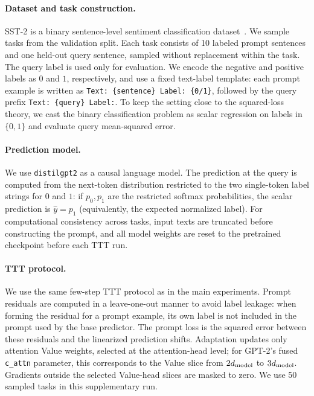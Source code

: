 \documentclass{article}
\theoremstyle{plain}
\theoremstyle{definition}
\theoremstyle{remark}
\begin{document}
\paragraph{Dataset and task construction.}
SST-2 is a binary sentence-level sentiment classification dataset~\citep{socher-etal-2013-recursive}. We sample tasks from the validation split. Each task consists of 10 labeled prompt sentences and one held-out query sentence, sampled without replacement within the task. The query label is used only for evaluation. We encode the negative and positive labels as $0$ and $1$, respectively, and use a fixed text-label template: each prompt example is written as \texttt{Text: \{sentence\} Label: \{0/1\}}, followed by the query prefix \texttt{Text: \{query\} Label:}. To keep the setting close to the squared-loss theory, we cast the binary classification problem as scalar regression on labels in $\{0,1\}$ and evaluate query mean-squared error.

\paragraph{Prediction model.}
We use \texttt{distilgpt2} as a causal language model. The prediction at the query is computed from the next-token distribution restricted to the two single-token label strings for $0$ and $1$: if $p_0,p_1$ are the restricted softmax probabilities, the scalar prediction is $\hat y=p_1$ (equivalently, the expected normalized label). For computational consistency across tasks, input texts are truncated before constructing the prompt, and all model weights are reset to the pretrained checkpoint before each TTT run.

\paragraph{TTT protocol.}
We use the same few-step TTT protocol as in the main experiments. Prompt residuals are computed in a leave-one-out manner to avoid label leakage: when forming the residual for a prompt example, its own label is not included in the prompt used by the base predictor. The prompt loss is the squared error between these residuals and the linearized prediction shifts. Adaptation updates only attention Value weights, selected at the attention-head level; for GPT-2's fused \texttt{c\_attn} parameter, this corresponds to the Value slice from $2d_{\rm model}$ to $3d_{\rm model}$. Gradients outside the selected Value-head slices are masked to zero. We use 50 sampled tasks in this supplementary run.
\end{document}
